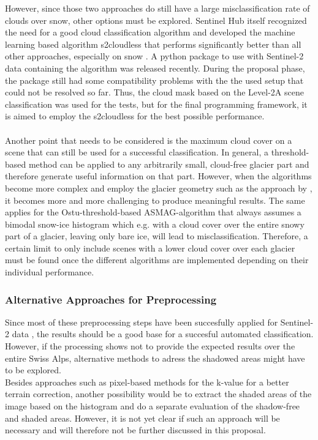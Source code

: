 \documentclass[12pt]{article}
\begin{document}
However, since those two approaches do still have a large misclassification rate of clouds over snow, other options must be explored. Sentinel Hub itself recognized the need for a good cloud classification algorithm and developed the machine learning based algorithm s2cloudless that performs significantly better than all other approaches, especially on snow \cite{s2cloudless}. A python package to use with Sentinel-2 data containing the algorithm was released recently. During the proposal phase, the package still had some compatibility problems with the the used setup that could not be resolved so far. Thus, the cloud mask based on the Level-2A scene classification was used for the tests, but for the final programming framework, it is aimed to employ the s2cloudless for the best possible performance. \\
\\
Another point that needs to be considered is the maximum cloud cover on a scene that can still be used for a successful classification. In general, a threshold-based method can be applied to any arbitrarily small, cloud-free glacier part and therefore generate useful information on that part. However, when the algorithms become more complex and employ the glacier geometry such as the approach  by \cite{Naegeli2018}, it becomes more and more challenging to produce meaningful results. The same applies for the Ostu-threshold-based ASMAG-algorithm that always assumes a bimodal snow-ice histogram which e.g. with a cloud cover over the entire snowy part of a glacier, leaving only bare ice, will lead to misclassification. Therefore, a certain limit to only include scenes with a lower cloud cover over each glacier must be found once the different algorithms are implemented depending on their individual performance.


\subsubsection{Alternative Approaches for Preprocessing}
Since most of these preprocessing steps have been succesfully applied for Sentinel-2 data \cite{Paul2016}, the results should be a good base for a succesful automated classification. However, if the processing shows not to provide the expected results over the entire Swiss Alps, alternative methods to adress the shadowed areas might have to be explored.\\
Besides approaches such as pixel-based methods for the k-value for a better terrain correction, another possibility would be to extract the shaded areas of the image based on the histogram and do a separate evaluation of the shadow-free and shaded areas. However, it is not yet clear if such an approach will be necessary and will therefore not be further discussed in this proposal.
\end{document}
